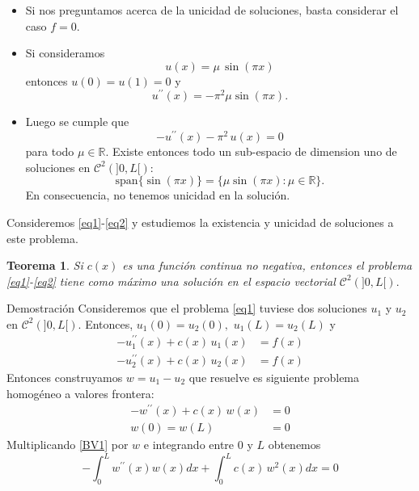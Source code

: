 \documentclass[10pt,handout]{beamer}
\theoremstyle{plain} %
\newtheorem{thm}{Teorema}
\theoremstyle{plain} %
\theoremstyle{plain} %
\theoremstyle{plain} %
\theoremstyle{definition}
\theoremstyle{example}
\theoremstyle{example}
\theoremstyle{remark}
\theoremstyle{remark}
\begin{document}
\begin{frame}
\begin{itemize}
\item Si nos preguntamos acerca de la unicidad de soluciones, basta considerar el caso $f=0.$
\item Si consideramos
$$
u(x) = \mu \, \sin(\pi x)
$$
entonces $u(0)=u(1)=0$ y
$$
u^{\prime \prime}(x) = - \pi^2 \mu \sin(\pi x).
$$ 
\item Luego se cumple que
$$
- u^{\prime \prime}(x) - \pi^2 \,u(x) = 0
$$
para todo $\mu \in \mathbb{R}.$ Existe entonces todo un sub-espacio de dimension uno de soluciones
en $\mathcal{C}^2(]0,L[):$
$$
\mathrm{span}\{ \sin(\pi x) \} =\{
\mu \sin(\pi x): \mu \in \mathbb{R}
\}.
$$
En consecuencia, no tenemos unicidad en la solución.
\end{itemize}
\end{frame}

\begin{frame}
Consideremos \eqref{eq1}-\eqref{eq2} y estudiemos la existencia y unicidad de soluciones a este problema.
\begin{thm}
Si $c(x)$ es una función continua no negativa, entonces el problema \eqref{eq1}-\eqref{eq2} tiene como máximo una solución en el espacio vectorial $\mathcal{C}^2(]0,L[).$
\end{thm}
\end{frame}

\begin{frame}{Demostración}
Consideremos que el problema \eqref{eq1} tuviese dos soluciones $u_1$ y $u_2$ en  $\mathcal{C}^2(]0,L[).$ Entonces, $u_1(0)=u_2(0),$  $u_1(L)=u_2(L)$ y 
\begin{align*}
- u_1^{\prime \prime}(x) + c(x)\,u_1(x) & = f(x)  \\ 
- u_2^{\prime \prime}(x) + c(x)\,u_2(x) & = f(x) 
\end{align*}
Entonces construyamos $w = u_1 - u_2$ que resuelve es siguiente problema homogéneo a valores frontera:
\begin{align}
- w^{\prime \prime}(x) + c(x)\,w(x) & = 0 \label{BV1} \\ 
 w(0)=w(L) & =0 \label{BV2}
\end{align}
Multiplicando \eqref{BV1} por $w$ e integrando entre $0$ y $L$ obtenemos
$$
- \int_0^L w^{\prime \prime}(x) w(x) dx + \int_0^L c(x)\,w^2(x) dx  = 0
$$
\end{frame}
\end{document}
